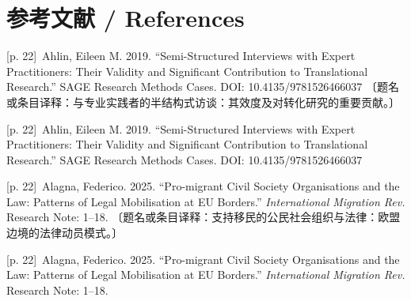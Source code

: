 \documentclass[10pt,a4paper]{article}
\begin{document}
\section*{参考文献 / References}
\noindent\begin{minipage}{\textwidth}\begin{minipage}[t]{\dimexpr.5\textwidth-4mm\relax}{\scriptsize\color{gray} [p. 22]}\ Ahlin, Eileen M. 2019. “Semi-Structured Interviews with Expert Practitioners: Their Validity and Significant Contribution to Translational Research.” SAGE Research Methods Cases. DOI: 10.4135/9781526466037 〔题名或条目译释：与专业实践者的半结构式访谈：其效度及对转化研究的重要贡献。〕\par\end{minipage}\hfill\begin{minipage}[t]{\dimexpr.5\textwidth-4mm\relax}{\scriptsize\color{gray} [p. 22]}\ Ahlin, Eileen M. 2019. “Semi-Structured Interviews with Expert Practitioners: Their Validity and Significant Contribution to Translational Research.” SAGE Research Methods Cases. DOI: 10.4135/9781526466037\par\end{minipage}\end{minipage}\par
\noindent\begin{minipage}{\textwidth}\begin{minipage}[t]{\dimexpr.5\textwidth-4mm\relax}{\scriptsize\color{gray} [p. 22]}\ Alagna, Federico. 2025. “Pro-migrant Civil Society Organisations and the Law: Patterns of Legal Mobilisation at EU Borders.” \textit{International Migration Rev.} Research Note: 1–18. 〔题名或条目译释：支持移民的公民社会组织与法律：欧盟边境的法律动员模式。〕\par\end{minipage}\hfill\begin{minipage}[t]{\dimexpr.5\textwidth-4mm\relax}{\scriptsize\color{gray} [p. 22]}\ Alagna, Federico. 2025. “Pro-migrant Civil Society Organisations and the Law: Patterns of Legal Mobilisation at EU Borders.” \textit{International Migration Rev.} Research Note: 1–18.\par\end{minipage}\end{minipage}\par
\end{document}
